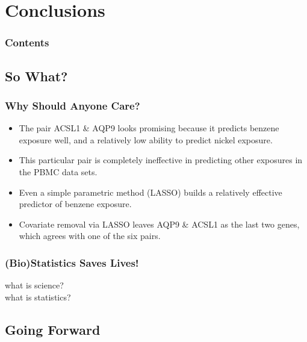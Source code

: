\documentclass{beamer}
\begin{document}
\section{Conclusions}

\begin{frame}
        \frametitle{Contents}
        \tableofcontents[currentsection,currentsubsection,hideothersubsections,sectionstyle=show/shaded]
\end{frame}

\subsection{So What?}

\begin{frame}[fragile]
  	\frametitle{Why Should Anyone Care?}
 		\begin{itemize}
			\item The pair ACSL1 \& AQP9 looks promising because it predicts benzene exposure well, and a relatively low ability to predict nickel exposure. 
			\item This particular pair is completely ineffective in predicting other exposures in the PBMC data sets.
			\item Even a simple parametric method (LASSO) builds a relatively effective predictor of benzene exposure.
			\item Covariate removal via LASSO leaves AQP9 \& ACSL1 as the last two genes, which agrees with one of the six pairs. 
		\end{itemize}
\end{frame}

\begin{frame}[fragile]
  	\frametitle{(Bio)Statistics Saves Lives!}
 		what is science? \\
		what is statistics?
\end{frame}

\subsection{Going Forward}
\end{document}
